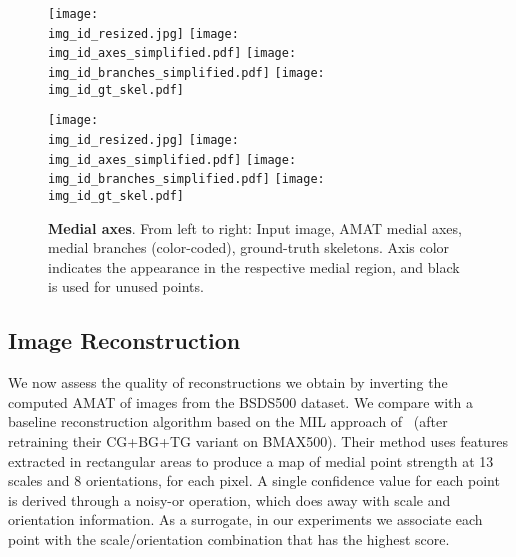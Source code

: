 \documentclass[10pt,twocolumn,letterpaper]{article}
\begin{document}
\begin{figure*}[t]
\centering
\def\imgw{0.245}
\def\img_id{3096}
\texttt{[image: \\img\_id\_resized.jpg]}
\texttt{[image: \\img\_id\_axes\_simplified.pdf]}
\texttt{[image: \\img\_id\_branches\_simplified.pdf]}
\texttt{[image: \\img\_id\_gt\_skel.pdf]}

\def\img_id{253055}
\texttt{[image: \\img\_id\_resized.jpg]}
\texttt{[image: \\img\_id\_axes\_simplified.pdf]}
\texttt{[image: \\img\_id\_branches\_simplified.pdf]}
\texttt{[image: \\img\_id\_gt\_skel.pdf]}


\caption{\textbf{Medial axes}. From left to right: Input image, AMAT medial axes, medial branches (color-coded), ground-truth skeletons.
Axis color indicates the appearance in the respective medial region, and black is used for unused points.}
\label{fig:experiments:detection:examples}
\end{figure*}


\subsection{Image Reconstruction}\label{sec:experiments:reconstruction}
We now assess the quality of reconstructions we obtain by inverting the computed AMAT
of images from the BSDS500 dataset.
We compare with a baseline reconstruction algorithm based on the MIL approach 
of~\cite{tsogkas2012learning} (after retraining their CG+BG+TG variant on BMAX500).
Their method uses features extracted in rectangular areas 
to produce a map of medial point strength at 13 scales and 8 orientations, for each pixel.
A single confidence value for each point is derived through a noisy-or operation,
which does away with scale and orientation information.
As a surrogate, in our experiments we associate each point with the scale/orientation combination
that has the highest score.
\end{document}
